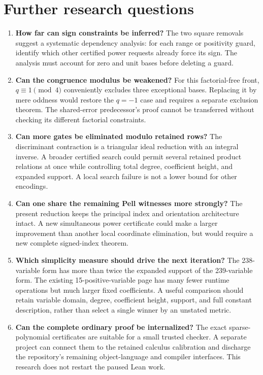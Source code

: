 \documentclass[11pt]{article}
\theoremstyle{remark}\newtheorem{remark}[theorem]{Remark}
\begin{document}
\section{Further research questions}

\begin{enumerate}
\item \textbf{How far can sign constraints be inferred?}
The two square removals suggest a systematic dependency analysis:
for each range or positivity guard, identify which other certified
power requests already force its sign. The analysis must account
for zero and unit bases before deleting a guard.
\item \textbf{Can the congruence modulus be weakened?}
For this factorial-free front, $q\equiv1\pmod4$ conveniently excludes
three exceptional bases. Replacing it by mere oddness would restore
the $q=-1$ case and requires a separate exclusion theorem. The
shared-error predecessor's proof cannot be transferred without
checking its different factorial constraints.
\item \textbf{Can more gates be eliminated modulo retained rows?}
The discriminant contraction is a triangular ideal reduction with
an integral inverse. A broader certified search could permit several
retained product relations at once while controlling total degree,
coefficient height, and expanded support. A local search failure is
not a lower bound for other encodings.
\item \textbf{Can one share the remaining Pell witnesses more strongly?}
The present reduction keeps the principal index and orientation
architecture intact. A new simultaneous power certificate could
make a larger improvement than another local coordinate elimination,
but would require a new complete signed-index theorem.
\item \textbf{Which simplicity measure should drive the next iteration?}
The 238-variable form has more than twice the expanded support of
the 239-variable form. The existing 15-positive-variable page has
many fewer runtime operations but much larger fixed coefficients.
A useful comparison should retain variable domain, degree, coefficient
height, support, and full constant description, rather than select
a single winner by an unstated metric.
\item \textbf{Can the complete ordinary proof be internalized?}
The exact sparse-polynomial certificates are suitable for a small
trusted checker. A separate project can connect them to the retained
calculus calibration and discharge the repository's remaining
object-language and compiler interfaces. This research does not
restart the paused Lean work.
\end{enumerate}
\end{document}
